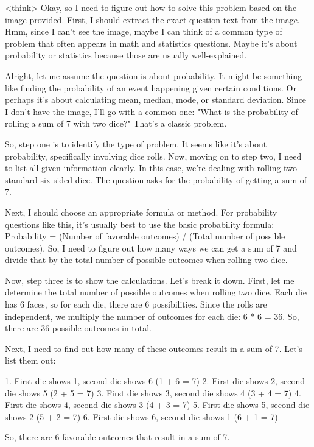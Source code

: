 <think>
Okay, so I need to figure out how to solve this problem based on the image provided. First, I should extract the exact question text from the image. Hmm, since I can't see the image, maybe I can think of a common type of problem that often appears in math and statistics questions. Maybe it's about probability or statistics because those are usually well-explained.

Alright, let me assume the question is about probability. It might be something like finding the probability of an event happening given certain conditions. Or perhaps it's about calculating mean, median, mode, or standard deviation. Since I don't have the image, I'll go with a common one: "What is the probability of rolling a sum of 7 with two dice?" That's a classic problem.

So, step one is to identify the type of problem. It seems like it's about probability, specifically involving dice rolls. Now, moving on to step two, I need to list all given information clearly. In this case, we're dealing with rolling two standard six-sided dice. The question asks for the probability of getting a sum of 7.

Next, I should choose an appropriate formula or method. For probability questions like this, it's usually best to use the basic probability formula: Probability = (Number of favorable outcomes) / (Total number of possible outcomes). So, I need to figure out how many ways we can get a sum of 7 and divide that by the total number of possible outcomes when rolling two dice.

Now, step three is to show the calculations. Let's break it down. First, let me determine the total number of possible outcomes when rolling two dice. Each die has 6 faces, so for each die, there are 6 possibilities. Since the rolls are independent, we multiply the number of outcomes for each die: 6 * 6 = 36. So, there are 36 possible outcomes in total.

Next, I need to find out how many of these outcomes result in a sum of 7. Let's list them out:

1. First die shows 1, second die shows 6 (1 + 6 = 7)
2. First die shows 2, second die shows 5 (2 + 5 = 7)
3. First die shows 3, second die shows 4 (3 + 4 = 7)
4. First die shows 4, second die shows 3 (4 + 3 = 7)
5. First die shows 5, second die shows 2 (5 + 2 = 7)
6. First die shows 6, second die shows 1 (6 + 1 = 7)

So, there are 6 favorable outcomes that result in a sum of 7.

